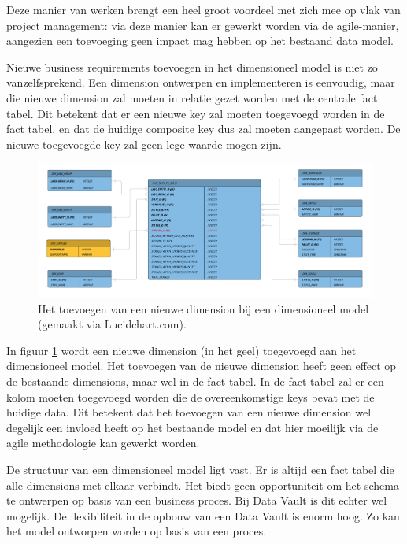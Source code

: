 Deze manier van werken brengt een heel groot voordeel met zich mee op vlak van project management: via deze manier kan er gewerkt worden via de agile-manier, aangezien een toevoeging geen impact mag hebben op het bestaand data model.

Nieuwe business requirements toevoegen in het dimensioneel model is niet zo vanzelfsprekend. Een dimension ontwerpen en implementeren is eenvoudig, maar die nieuwe dimension zal moeten in relatie gezet worden met de centrale fact tabel. Dit betekent dat er een nieuwe key zal moeten toegevoegd worden in de fact tabel, en dat de huidige composite key dus zal moeten aangepast worden. De nieuwe toegevoegde key zal geen lege waarde mogen zijn.

\begin{figure}[h]
	\centering
	\includegraphics[scale=0.45]{../images/changedm.png}
	\caption{Het toevoegen van een nieuwe dimension bij een dimensioneel model (gemaakt via Lucidchart.com).}
	\label{fig:changedm}
\end{figure}

In figuur \ref{fig:changedm} wordt een nieuwe dimension (in het geel) toegevoegd aan het dimensioneel model. Het toevoegen van de nieuwe dimension heeft geen effect op de bestaande dimensions, maar wel in de fact tabel. In de fact tabel zal er een kolom moeten toegevoegd worden die de overeenkomstige keys bevat met de huidige data. Dit betekent dat het toevoegen van een nieuwe dimension wel degelijk een invloed heeft op het bestaande model en dat hier moeilijk via de agile methodologie kan gewerkt worden.

De structuur van een dimensioneel model ligt vast. Er is altijd een fact tabel die alle dimensions met elkaar verbindt. Het biedt geen opportuniteit om het schema te ontwerpen op basis van een business proces. Bij Data Vault is dit echter wel mogelijk. De flexibiliteit in de opbouw van een Data Vault is enorm hoog. Zo kan het model ontworpen worden op basis van een proces.

